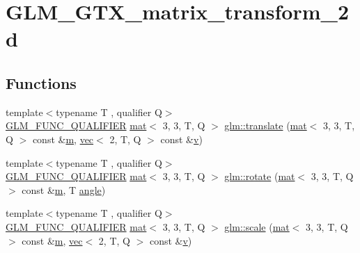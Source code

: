 \hypertarget{group__gtx__matrix__transform__2d}{}\section{G\+L\+M\+\_\+\+G\+T\+X\+\_\+matrix\+\_\+transform\+\_\+2d}
\label{group__gtx__matrix__transform__2d}
\subsection*{Functions}
\begin{DoxyCompactItemize}
\item 
{\footnotesize template$<$typename T , qualifier Q$>$ }\\\mbox{\hyperlink{setup_8hpp_a33fdea6f91c5f834105f7415e2a64407}{G\+L\+M\+\_\+\+F\+U\+N\+C\+\_\+\+Q\+U\+A\+L\+I\+F\+I\+ER}} \mbox{\hyperlink{structglm_1_1mat}{mat}}$<$ 3, 3, T, Q $>$ \mbox{\hyperlink{group__gtx__matrix__transform__2d_gaa862e868893cf0b963e1d52e5dfb20c0}{glm\+::translate}} (\mbox{\hyperlink{structglm_1_1mat}{mat}}$<$ 3, 3, T, Q $>$ const \&\mbox{\hyperlink{_s_d_l__opengl__glext_8h_af593500c283bf1a787a6f947f503a5c2}{m}}, \mbox{\hyperlink{structglm_1_1vec}{vec}}$<$ 2, T, Q $>$ const \&\mbox{\hyperlink{_s_d_l__opengl_8h_a10a82eabcb59d2fcd74acee063775f90}{v}})
\item 
{\footnotesize template$<$typename T , qualifier Q$>$ }\\\mbox{\hyperlink{setup_8hpp_a33fdea6f91c5f834105f7415e2a64407}{G\+L\+M\+\_\+\+F\+U\+N\+C\+\_\+\+Q\+U\+A\+L\+I\+F\+I\+ER}} \mbox{\hyperlink{structglm_1_1mat}{mat}}$<$ 3, 3, T, Q $>$ \mbox{\hyperlink{group__gtx__matrix__transform__2d_gaddca86444c3dee30a0aa07673d68743d}{glm\+::rotate}} (\mbox{\hyperlink{structglm_1_1mat}{mat}}$<$ 3, 3, T, Q $>$ const \&\mbox{\hyperlink{_s_d_l__opengl__glext_8h_af593500c283bf1a787a6f947f503a5c2}{m}}, T \mbox{\hyperlink{_s_d_l__opengl__glext_8h_a9e06c1f76a20fed54ca742cd25cb02c4}{angle}})
\item 
{\footnotesize template$<$typename T , qualifier Q$>$ }\\\mbox{\hyperlink{setup_8hpp_a33fdea6f91c5f834105f7415e2a64407}{G\+L\+M\+\_\+\+F\+U\+N\+C\+\_\+\+Q\+U\+A\+L\+I\+F\+I\+ER}} \mbox{\hyperlink{structglm_1_1mat}{mat}}$<$ 3, 3, T, Q $>$ \mbox{\hyperlink{group__gtx__matrix__transform__2d_ga6fd2493e8271ee595898e9b3d434c1a7}{glm\+::scale}} (\mbox{\hyperlink{structglm_1_1mat}{mat}}$<$ 3, 3, T, Q $>$ const \&\mbox{\hyperlink{_s_d_l__opengl__glext_8h_af593500c283bf1a787a6f947f503a5c2}{m}}, \mbox{\hyperlink{structglm_1_1vec}{vec}}$<$ 2, T, Q $>$ const \&\mbox{\hyperlink{_s_d_l__opengl_8h_a10a82eabcb59d2fcd74acee063775f90}{v}})

\end{DoxyCompactItemize}
